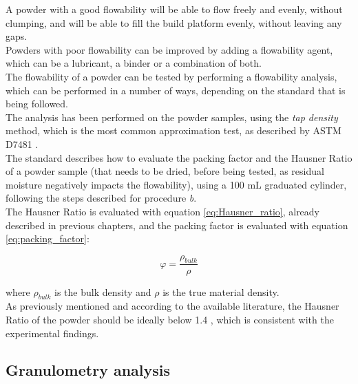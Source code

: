 \documentclass[a4paper]{article}
\begin{document}
        A powder with a good flowability will be able to flow freely and evenly, without clumping, and will be able to fill the 
        build platform evenly, without leaving any gaps. \\ 

        Powders with poor flowability can be improved by adding a flowability agent, which can be a lubricant, a binder or a 
        combination of both. \\ 

        The flowability of a powder can be tested by performing a flowability analysis, which can be performed in a number of ways, 
        depending on the standard that is being followed. \\

        The analysis has been performed on the powder samples, using the \textit{tap density} method, which is the most common 
        approximation test, as described by ASTM D7481 \autocites{ASTM_D7481-18}. \\

        The standard describes how to evaluate the packing factor and the Hausner Ratio of a powder sample (that needs to be 
        dried, before being tested, as residual moisture negatively impacts the flowability), 
        using a 100 mL graduated cylinder, following the steps described for procedure \textit{b}. \\

        The Hausner Ratio is evaluated with equation \ref{eq:Hausner_ratio}, already described in previous chapters, 
        and the packing factor is evaluated with equation \ref{eq:packing_factor}: 

            \begin{equation}
                \varphi  = \frac{\rho_{bulk}}{\rho}
                \label{eq:packing_factor}
            \end{equation}

        where $\rho_{bulk}$ is the bulk density and $\rho$ is the true material density. \\

        As previously mentioned and according to the available literature, the Hausner Ratio of the powder should 
        be ideally below 1.4 \autocites{doi:10.1063/1.4918516}, which is consistent with the experimental findings. \\  

        \clearpage

        \subsection{Granulometry analysis\label{granulometry_analysis}}
\end{document}
